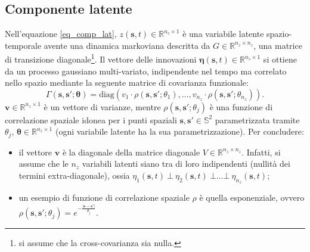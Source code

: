 \subsection[Componente latente]{Componente latente}
Nell'equazione \ref{eq_comp_lat}, $z(\mathbf{s}, t)\in \mathbb{R}^{n_z\times 1}$ è una variabile latente spazio-temporale avente una dinamica markoviana descritta da $G\in\mathbb{R}^{n_z\times n_z}$, una matrice di transizione diagonale\footnote{si assume che la cross-covarianza sia nulla.}. Il vettore delle innovazioni $\boldsymbol{\eta}(\mathbf{s}, t)\in\mathbb{R}^{n_z\times 1}$ si ottiene da un processo gaussiano multi-variato, indipendente nel tempo ma correlato nello spazio mediante la seguente matrice di covarianza funzionale:
\begin{equation}
	\Gamma(\mathbf{s}, \mathbf{s}';\boldsymbol{\theta})=\text{diag}(v_1\cdot\rho(\mathbf{s}, \mathbf{s}';\theta_1),\dots,v_{n_z}\cdot\rho(\mathbf{s}, \mathbf{s}';\theta_{n_z})).
\end{equation}
$\mathbf{v}\in\mathbb{R}^{n_z\times 1}$ è un vettore di varianze, mentre $\rho(\mathbf{s}, \mathbf{s}'; \theta_j)$ è una funzione di correlazione spaziale idonea per i punti spaziali $\mathbf{s}, \mathbf{s}'\in\mathbb{S}^2$ parametrizzata tramite $\theta_j$, $\boldsymbol{\theta}\in\mathbb{R}^{n_z\times 1}$ (ogni variabile latente ha la sua parametrizzazione). Per concludere:
\begin{itemize}
	\item il vettore $\mathbf{v}$ è la diagonale della matrice diagonale $V\in\mathbb{R}^{n_z\times n_z}$. Infatti, si assume che le $n_z$ variabili latenti siano tra di loro indipendenti (nullità dei termini extra-diagonale), ossia $\eta_1(\mathbf{s}, t)\ \bot\ \eta_2(\mathbf{s}, t)\ \bot\dots\bot \ \eta_{n_z}(\mathbf{s}, t)$;
	\item un esempio di funzione di correlazione spaziale $\rho$ è quella esponenziale, ovvero $\rho(\mathbf{s}, \mathbf{s}'; \theta_j) = e^{-\frac{\lvert\mathbf{s} - \mathbf{s}'\lvert}{\theta_j}}$.
\end{itemize}

